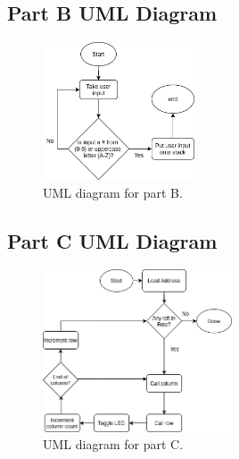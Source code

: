 \documentclass[10pt, letterpaper, titlepage]{article} %
\begin{document}
\subsection{Part B UML Diagram}
\begin{figure}[H]
   \includegraphics[width=0.4\textwidth]{UML2.png}
   \centering  
   \caption{UML diagram for part B.} 
   \label{figure:2}
\end{figure}

\subsection{Part C UML Diagram}
\begin{figure}[H]
   \includegraphics[width=0.5\textwidth]{UML3.png}
   \centering  
   \caption{UML diagram for part C.} 
   \label{figure:3}
\end{figure}
\end{document}

